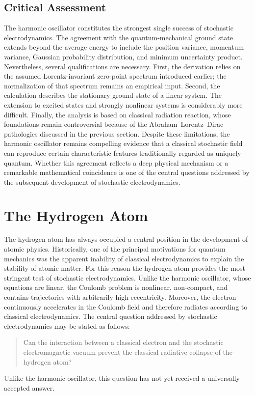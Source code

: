 \subsection*{Critical Assessment}
The harmonic oscillator constitutes the strongest single success of
stochastic electrodynamics. The agreement with the quantum-mechanical
ground state extends beyond the average energy to include the position
variance, momentum variance, Gaussian probability distribution, and
minimum uncertainty product.
Nevertheless, several qualifications are necessary.
First, the derivation relies on the assumed Lorentz-invariant
zero-point spectrum introduced earlier; the normalization of that
spectrum remains an empirical input. Second, the calculation describes
the stationary ground state of a linear system. The extension to excited
states and strongly nonlinear systems is considerably more difficult.
Finally, the analysis is based on classical radiation reaction, whose
foundations remain controversial because of the Abraham–Lorentz–Dirac
pathologies discussed in the previous section.
Despite these limitations, the harmonic oscillator remains compelling
evidence that a classical stochastic field can reproduce certain
characteristic features traditionally regarded as uniquely quantum.
Whether this agreement reflects a deep physical mechanism or a
remarkable mathematical coincidence is one of the central questions
addressed by the subsequent development of stochastic electrodynamics.
\section{The Hydrogen Atom}
\label{sec:SEDHydrogen}
The hydrogen atom has always occupied a central position in the
development of atomic physics. Historically, one of the principal
motivations for quantum mechanics was the apparent inability of
classical electrodynamics to explain the stability of atomic matter.
For this reason the hydrogen atom provides the most stringent test of
stochastic electrodynamics. Unlike the harmonic oscillator, whose
equations are linear, the Coulomb problem is nonlinear, non-compact, and
contains trajectories with arbitrarily high eccentricity. Moreover, the
electron continuously accelerates in the Coulomb field and therefore
radiates according to classical electrodynamics.
The central question addressed by stochastic electrodynamics may be
stated as follows:
\begin{quote}
Can the interaction between a classical electron and the stochastic
electromagnetic vacuum prevent the classical radiative collapse of the
hydrogen atom?
\end{quote}
Unlike the harmonic oscillator, this question has not yet received a
universally accepted answer.
